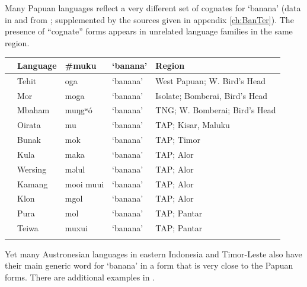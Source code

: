 Many Papuan languages reflect a very different set of cognates
for ‘banana’ (data in  and  from
\citet{DenhamDonohue2009}; supplemented
by the sources given in appendix \ref{ch:BanTer}).
The presence of “cognate” forms appears in unrelated language
families in the same region.

{\wg\begin{xltabular}{\linewidth}{>{\hspace{-\tabcolsep}}l<{\hspace{-\tabcolsep}}>{\hspace{-\tabcolsep}\enspace}llll}
\lsptoprule
{}		&	Language	&	{\#}muku	&	‘banana’	&	Region		\\ \midrule \hhline{~}
	&	Tehit	&	oga	&	‘banana’	&	West Papuan; W. Bird’s Head		\\
	&	Mor	&	moga	&	‘banana’	&	Isolate; Bomberai, Bird’s Head		\\
	&	Mbaham	&	muŋgʷó	&	‘banana’	&	TNG; W. Bomberai; Bird’s Head		\\
	&	Oirata	&	mu	&	‘banana’	&	TAP; Kisar, Maluku		\\
	&	Bunak	&	mok	&	‘banana’	&	TAP; Timor		\\
	&	Kula	&	maka	&	‘banana’	&	TAP; Alor		\\
	&	Wersing	&	məlul	&	‘banana’	&	TAP; Alor		\\
	&	Kamang	&	mooi {\tl} muui	&	‘banana’	&	TAP; Alor		\\
	&	Klon	&	mgol\footnotemark 	&	‘banana’	&	TAP; Alor		\\
	&	Pura	&	mol	&	‘banana’	&	TAP; Pantar		\\
	&	Teiwa	&	muxui	&	‘banana’	&	TAP; Pantar		\\
\lspbottomrule
\end{xltabular}\addtocounter{table}{-1}}
		
Yet many Austronesian languages in eastern Indonesia
and Timor-Leste also have their main generic word for ‘banana’
in a form that is very close to the Papuan forms.
There are additional examples in \citet{DenhamDonohue2009}.

